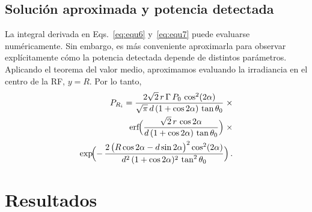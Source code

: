 \documentclass[11pt,a4paper]{article}
\begin{document}
\begin{multicols}{2}
\subsection{Solución aproximada y potencia detectada}
La integral derivada en Eqs.~\eqref{eq:equ6} y~\eqref{eq:equ7} puede evaluarse numéricamente. Sin embargo, es más conveniente aproximarla para observar explícitamente cómo la potencia detectada depende de distintos parámetros. Aplicando el teorema del valor medio, aproximamos evaluando la irradiancia en el centro de la RF, $y = R$. Por lo tanto,
%
%
\begin{align}
    P_{R_i}
    =
            \frac{2\sqrt{2}\,r\,\Gamma\,P_0\,\cos^2(2\alpha)}{\sqrt{\pi}\,d\,(1+\cos 2\alpha)\,\tan\theta_0}%
        \;\times\notag\\
            \mathrm{erf}\!\Bigl(
            \frac{\sqrt{2}\,r \,\cos 2\alpha}{d\,(1 + \cos 2\alpha)\,\tan \theta_0}
            \Bigr)%
    \;\times\notag\\
            \exp\!\Bigl(
            -\,\frac{2\,\bigl(R\cos 2\alpha - d\sin 2\alpha\bigr)^2 \cos^2(2\alpha)}
            {d^2\,(1 + \cos 2\alpha)^2\,\tan^2 \theta_0}%
            \Bigr)%
    \,.
    \label{eq:equ9}
\end{align}
%
%
\section{Resultados}\label{sec:5_02}

\end{multicols}
\end{document}
